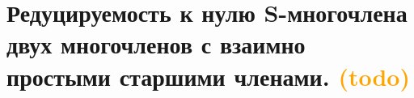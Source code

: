 \section{Редуцируемость к нулю S-многочлена двух многочленов с взаимно простыми старшими членами. \textcolor{orange}{(todo)}}
